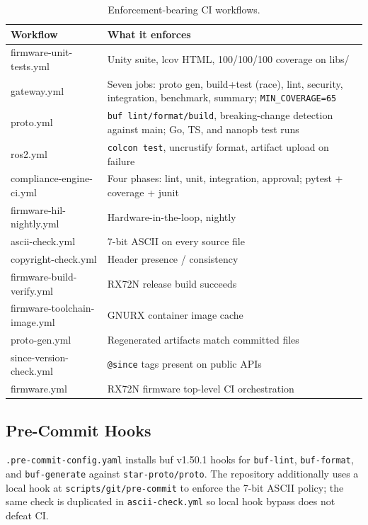 \documentclass[11pt,letterpaper]{article}
\begin{document}
\begin{table}[H]
\centering
\caption{Enforcement-bearing CI workflows.}
\label{tab:workflows}
\small
\begin{tabularx}{\linewidth}{l X}
\toprule
\textbf{Workflow} & \textbf{What it enforces} \\
\midrule
firmware-unit-tests.yml     & Unity suite, lcov HTML, 100/100/100 coverage
                              on libs/ \\
gateway.yml                 & Seven jobs: proto gen, build+test (race),
                              lint, security, integration, benchmark,
                              summary; \texttt{MIN\_COVERAGE=65} \\
proto.yml                   & \texttt{buf lint/format/build},
                              breaking-change detection against main;
                              Go, TS, and nanopb test runs \\
ros2.yml                    & \texttt{colcon test}, uncrustify format,
                              artifact upload on failure \\
compliance-engine-ci.yml    & Four phases: lint, unit, integration,
                              approval; pytest + coverage + junit \\
firmware-hil-nightly.yml    & Hardware-in-the-loop, nightly \\
ascii-check.yml             & 7-bit ASCII on every source file \\
copyright-check.yml         & Header presence / consistency \\
firmware-build-verify.yml   & RX72N release build succeeds \\
firmware-toolchain-image.yml & GNURX container image cache \\
proto-gen.yml               & Regenerated artifacts match committed files \\
since-version-check.yml     & \texttt{@since} tags present on public APIs \\
firmware.yml                & RX72N firmware top-level CI orchestration \\
\bottomrule
\end{tabularx}
\end{table}

\subsection{Pre-Commit Hooks}
\texttt{.pre-commit-config.yaml} installs buf v1.50.1 hooks for
\texttt{buf-lint}, \texttt{buf-format}, and \texttt{buf-generate}
against \texttt{star-proto/proto}. The repository additionally uses a
local hook at \texttt{scripts/git/pre-commit} to enforce the 7-bit
ASCII policy; the same check is duplicated in
\texttt{ascii-check.yml} so local hook bypass does not defeat CI.
\end{document}
